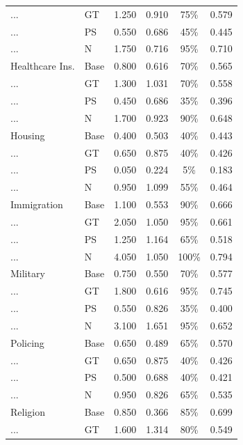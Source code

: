 \documentclass{article}
\begin{document}
\begin{longtable}{llcccc}
    ...              & GT   & 1.250 & 0.910 & 75\% & 0.579 \\
    ...              & PS   & 0.550 & 0.686 & 45\% & 0.445 \\
    ...              & N    & 1.750 & 0.716 & 95\% & 0.710 \\
    \addlinespace
    Healthcare Ins.  & Base & 0.800 & 0.616 & 70\% & 0.565 \\
    ...              & GT   & 1.300 & 1.031 & 70\% & 0.558 \\
    ...              & PS   & 0.450 & 0.686 & 35\% & 0.396 \\
    ...              & N    & 1.700 & 0.923 & 90\% & 0.648 \\
    \addlinespace
    Housing          & Base & 0.400 & 0.503 & 40\% & 0.443 \\
    ...              & GT   & 0.650 & 0.875 & 40\% & 0.426 \\
    ...              & PS   & 0.050 & 0.224 & 5\% & 0.183 \\
    ...              & N    & 0.950 & 1.099 & 55\% & 0.464 \\
    \addlinespace
    Immigration      & Base & 1.100 & 0.553 & 90\% & 0.666 \\
    ...              & GT   & 2.050 & 1.050 & 95\% & 0.661 \\
    ...              & PS   & 1.250 & 1.164 & 65\% & 0.518 \\
    ...              & N    & 4.050 & 1.050 & 100\% & 0.794 \\
    \addlinespace
    Military         & Base & 0.750 & 0.550 & 70\% & 0.577 \\
    ...              & GT   & 1.800 & 0.616 & 95\% & 0.745 \\
    ...              & PS   & 0.550 & 0.826 & 35\% & 0.400 \\
    ...              & N    & 3.100 & 1.651 & 95\% & 0.652 \\
    \addlinespace
    Policing         & Base & 0.650 & 0.489 & 65\% & 0.570 \\
    ...              & GT   & 0.650 & 0.875 & 40\% & 0.426 \\
    ...              & PS   & 0.500 & 0.688 & 40\% & 0.421 \\
    ...              & N    & 0.950 & 0.826 & 65\% & 0.535 \\
    \addlinespace
    Religion         & Base & 0.850 & 0.366 & 85\% & 0.699 \\
    ...              & GT   & 1.600 & 1.314 & 80\% & 0.549 \\

\end{longtable}
\end{document}
